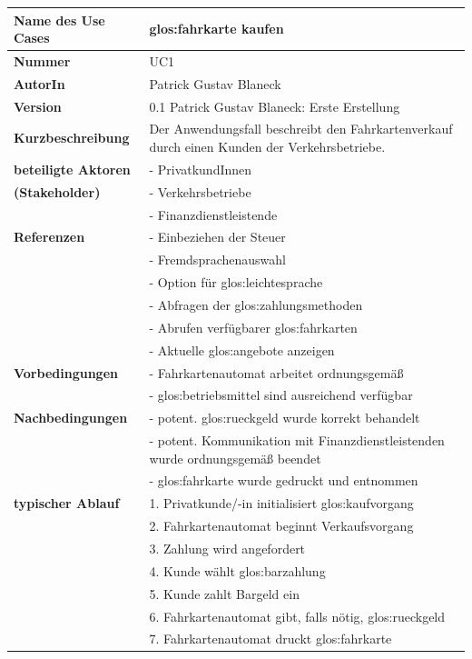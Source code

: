 \documentclass{lastenheft}
\begin{document}
\begin{xltabular}{\linewidth}{|>{\bfseries}p{4cm}|X|}
    \hline
    Name des Use Cases & \gls{glos:fahrkarte} kaufen \\
    \hline
    Nummer & UC1 \\
    \hline
    AutorIn & Patrick Gustav Blaneck \\
    \hline
    Version & 0.1 Patrick Gustav Blaneck: Erste Erstellung \\
    \hline
    Kurzbeschreibung & Der Anwendungsfall beschreibt den Fahrkartenverkauf durch einen Kunden der Verkehrsbetriebe.\\
    \hline
    beteiligte Aktoren & - PrivatkundInnen \\
    (Stakeholder) & - Verkehrsbetriebe \\
    & - Finanzdienstleistende \\
    \hline
    Referenzen & - Einbeziehen der Steuer \\
    & - Fremdsprachenauswahl \\
    & - Option für \gls{glos:leichtesprache} \\
    & - Abfragen der \gls{glos:zahlungsmethode}n \\
    & - Abrufen verfügbarer \gls{glos:fahrkarte}n \\
    & - Aktuelle \gls{glos:angebot}e anzeigen \\
    \hline
    Vorbedingungen & - Fahrkartenautomat arbeitet ordnungsgemäß \\
    & - \gls{glos:betriebsmittel} sind ausreichend verfügbar \\
    \hline
    Nachbedingungen & - potent. \gls{glos:rueckgeld} wurde korrekt behandelt \\
    & - potent. Kommunikation mit Finanzdienstleistenden wurde ordnungsgemäß beendet \\
    & - \gls{glos:fahrkarte} wurde gedruckt und entnommen \\
    \hline
    typischer Ablauf & 1. Privatkunde/-in initialisiert \gls{glos:kaufvorgang} \\
    & 2. Fahrkartenautomat beginnt Verkaufsvorgang \\
    & 3. Zahlung wird angefordert \\
    & 4. Kunde wählt \gls{glos:barzahlung} \\
    & 5. Kunde zahlt Bargeld ein \\
    & 6. Fahrkartenautomat gibt, falls nötig, \gls{glos:rueckgeld} \\
    & 7. Fahrkartenautomat druckt \gls{glos:fahrkarte} \\

\end{xltabular}
\end{document}
